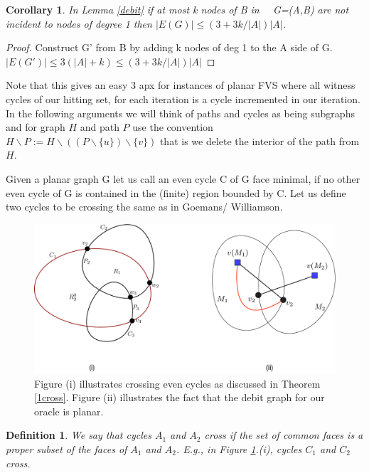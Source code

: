 \documentclass[letterpaper,11pt]{article}
\newtheorem{definition}[theorem]{Definition}
\newtheorem{corollary}[theorem]{Corollary}
\newcommand{\0}{\mathbb{0}}
\newcommand{\1}{\mathbb{1}}
\begin{document}
\begin{corollary}\label{lack witness}
In Lemma \ref{debit} if at most k nodes of B  in \ \ G=(A,B) are not incident to nodes of degree 1 then $|E(G) | \leq  (3 + 3k/|A| )|A| $.
\end{corollary}
\begin{proof}
Construct G' from B by adding k nodes of deg 1  to the A side of G.  $ |E(G')| \leq 3(| A |+k )  \leq (3 + 3k/|A| ) |A| $
\end{proof}

Note that this gives an easy 3 apx for instances of planar FVS where all witness cycles of our hitting set, for each iteration is a cycle incremented in our iteration.   In the following arguments  we will think of  paths and cycles as being subgraphs and for graph $H$ and path $P$  use the convention $ H \backslash P := H \backslash  (( P \backslash \{u \}   ) \backslash \{v \} ) $   that is we delete the interior of the path from $H$.

Given a planar graph G let us call an even cycle C of G face minimal, if no other even cycle of G is contained in the (finite) region bounded by C.   Let us define two cycles to be crossing the same as in Goemans/ Williamson.

\begin{figure}[H]
\begin{center}
\includegraphics[width=.9\textwidth]{crossings.pdf}
\end{center}
\caption{\label{fig:crossings}Figure (i) illustrates crossing even
  cycles as discussed in Theorem \ref{1cross}. Figure (ii) illustrates
  the fact that
  the debit graph for our oracle is planar.}
\end{figure}

\begin{definition}
We say that cycles $A_1$ and $A_2$ {\em cross} if the set of common
faces is a proper subset of the faces of $A_1$ and $A_2$. E.g., in Figure \ref{fig:crossings}.(i), cycles $C_1$ and $C_2$ cross.
\end{definition}
\end{document}
